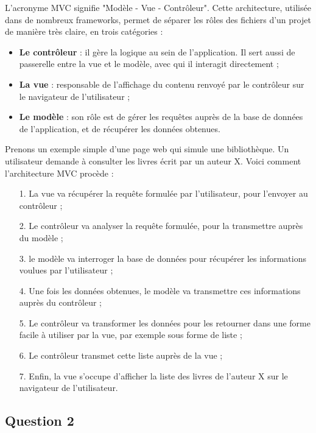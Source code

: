 \documentclass[12pt,a4paper]{article}
\begin{document}
	 L'acronyme MVC signifie "Modèle - Vue - Contrôleur". Cette architecture, utilisée dans de nombreux frameworks, permet de séparer les rôles des fichiers d'un projet de manière très claire, en trois catégories : \\
	 
	 \begin{itemize}
	 	\item \textbf{Le contrôleur} : il gère la logique au sein de l'application. Il sert aussi de passerelle entre la vue et le modèle, avec qui il interagit directement ;
	 	\item \textbf{La vue} : responsable de l'affichage du contenu renvoyé par le contrôleur sur le navigateur de l'utilisateur ;
	 	\item \textbf{Le modèle} : son rôle est de gérer les requêtes auprès de la base de données de l'application, et de récupérer les données obtenues. \\
	 \end{itemize}
	 
	 Prenons un exemple simple d'une page web qui simule une bibliothèque. Un utilisateur demande à consulter les livres écrit par un auteur X. Voici comment l'architecture MVC procède : \\
	 
		\begin{itemize}
			\item[1.]La vue va récupérer la requête formulée par l'utilisateur, pour l'envoyer au contrôleur ;
			\item[2.] Le contrôleur va analyser la requête formulée, pour la transmettre auprès du modèle ;
			\item[3.] le modèle va interroger la base de données pour récupérer les informations voulues par l'utilisateur ;
			\item[4.] Une fois les données obtenues, le modèle va transmettre ces informations auprès du contrôleur ;
			\item[5.] Le contrôleur va transformer les données pour les retourner dans une forme facile à utiliser par la vue, par exemple sous forme de liste ;
			\item[6.] Le contrôleur transmet cette liste auprès de la vue ;
			\item[7.] Enfin, la vue s'occupe d'afficher la liste des livres de l'auteur X sur le navigateur de l'utilisateur.
		\end{itemize}			 

	 	
	 \subsection*{Question 2}
\end{document}
